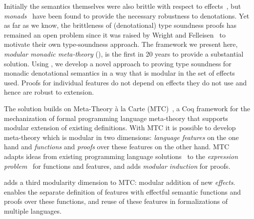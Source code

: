 Initially the semantics themselves were also brittle with respect to
effects~\cite{mosses84sdt,lee1989realistic}, but
\emph{monads}~\cite{Moggi89a,Wadler92a} have been found to provide the
necessary robustness to denotations. Yet as far as we know, the brittleness 
of (denotational) type soundness proofs has remained an open problem since it was raised by Wright and
Felleisen~\cite{wright94syntactic} to motivate their own type-soundness
approach. The framework we present here, \emph{modular monadic meta-theory} (\Name), is
the first in 20 years to provide a substantial solution. Using \Name, we develop a
novel approach to proving type soundness for monadic denotational
semantics in a way that is modular in the set of effects used. Proofs for
individual features do not depend on effects they do not use and hence
are robust to extension.



The solution builds on Meta-Theory \`{a} la Carte (MTC)~\cite{mtc}, a Coq
framework for the mechanization of formal programming language meta-theory that
supports modular extension of existing definitions. With MTC it is possible to
develop meta-theory which is modular in two dimensions: \emph{language features}
on the one hand and \emph{functions} and \emph{proofs} over these features on
the other hand. MTC adapts ideas from existing programming language
solutions~\cite{swierstra08dtc,oliveira09modular} to the \emph{expression
problem}~\cite{wadler98expression-problem} for functions and features, and adds
\emph{modular induction} for proofs.

\name adds a third modularity dimension to MTC: modular addition of new \emph{effects}. 
\name enables the separate definition of features with
effectful semantic functions and proofs over these functions, and reuse of
these features in formalizations of multiple languages.

